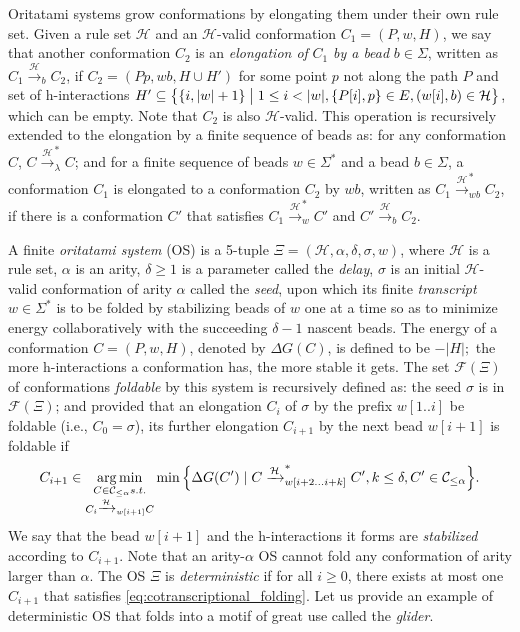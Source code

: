 Oritatami systems grow conformations by elongating them under their own rule set. 
Given a rule set $\mathcal{H}$ and an $\mathcal{H}$-valid conformation $C_1 = (P, w, H)$, 
we say that another conformation $C_2$ is an \textit{elongation of} $C_1$ \textit{by a bead} $b \in \Sigma$, written as $C_1 \xrightarrow{\mathcal{H}}_b C_2$, if $C_2 = (Pp, wb, H \cup H')$ for some point $p$ not along the path $P$ and set of h-interactions $H' \subseteq \left\{ \{i, |w|+1\} \bigm| 1\leq i < |w|, \{P[i], p\} \in E, (w[i], b) \in \mathcal{H}\right\}$, which can be empty.
Note that $C_2$ is also $\mathcal{H}$-valid.
This operation is recursively extended to the elongation by a finite sequence of beads as: 
for any conformation $C$, $C \xrightarrow{\mathcal{H}}^*_\lambda C$; 
and for a finite sequence of beads $w \in \Sigma^*$ and a bead $b \in \Sigma$,
a conformation $C_1$ is elongated to a conformation $C_2$ by $wb$,
written as $C_1 \xrightarrow{\mathcal{H}}^*_{wb} C_2$, if there is a conformation $C'$ that satisfies
$C_1 \xrightarrow{\mathcal{H}}^*_w C'$ and $C' \xrightarrow{\mathcal{H}}_b C_2$.

A finite \textit{oritatami system} (OS) is a 5-tuple $\Xi = (\mathcal{H}, \alpha, \delta, \sigma,w)$, where 
$\mathcal{H}$ is a rule set,
$\alpha$ is an arity, 
$\delta \geq 1$ is a parameter called the \textit{delay}, 
$\sigma$ is an initial $\mathcal{H}$-valid conformation of arity $\alpha$ called the \textit{seed}, upon which its finite \textit{transcript} $w \in \Sigma^*$ is to be folded by stabilizing beads of $w$ one at a time so as to minimize energy collaboratively with the succeeding $\delta -1$ nascent beads. 
The energy of a conformation $C = (P, w, H)$, denoted by $\Delta G(C)$, is defined to be $-|H|;$ the more h-interactions a conformation has, the more stable it gets.
The set $\mathcal{F}(\Xi)$ of conformations \textit{foldable} by this system is recursively defined as: 
the seed $\sigma$ is in $\mathcal{F}(\Xi)$; and provided that an elongation $C_{i}$ of $\sigma$ by the prefix $w[1..i]$ be foldable (i.e., $C_0 = \sigma$), its further elongation $C_{i+1}$ by the next bead $w[i+1]$ is foldable if
\begin{equation}\label{eq:cotranscriptional_folding}
C_{i+1} \in \operatorname*{arg\,min}_{
\substack{
C \in \mathcal{C}_{\le \alpha} s.t. \\
C_i \xrightarrow{\mathcal{H}}_{w[i+1]}C \\
}
}
\min \Big\{ \Delta G(C') \mid 
C \xrightarrow{\mathcal{H}}^*_{w[i+2...i+k]}C', k\le \delta, C' \in \mathcal{C}_{\le \alpha}
\Big\}.
\end{equation}
We say that the bead $w[i+1]$ and the h-interactions it forms are \textit{stabilized} according to $C_{i+1}$.
Note that an arity-$\alpha$ OS cannot fold any conformation of arity larger than $\alpha$.
The OS $\Xi$ is \textit{deterministic} if for all $i \ge 0$, there exists at most one $C_{i+1}$ that satisfies \eqref{eq:cotranscriptional_folding}. 
Let us provide an example of deterministic OS that folds into a motif of great use called the \textit{glider}. 

